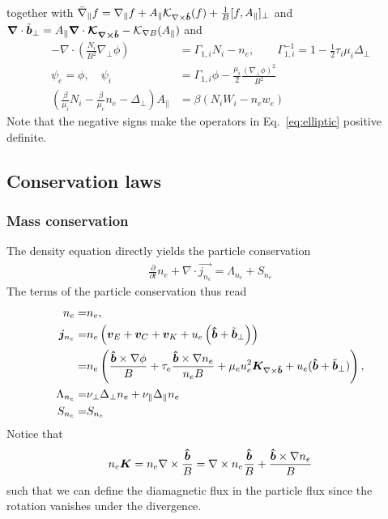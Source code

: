 together with
$\bar\nabla_\parallel f = \nabla_\parallel f + A_\parallel \mathcal K_{\nabla\times\bm{\hat{b}}}(f) + \frac{1}{B}[ f, A_\parallel]_\perp$
and ${\boldsymbol{\nabla}} \cdot \tilde{ {\boldsymbol{b}}}_\perp = A_\parallel {\boldsymbol{\nabla}}\cdot{\boldsymbol{ \mathcal{ K}_{\nabla\times\bm{\hat{b}}}}} - \mathcal K_{\nabla B}(A_\parallel) $
and
\begin{subequations} \label{eq:elliptic}
  \begin{align}
    -\nabla\cdot\left( \frac{N_i}{B^2}\nabla_\perp \phi \right) &= \Gamma_{1,i} N_i - n_e, \quad\quad
    \Gamma_{1,i}^{-1} = 1-\frac{1}{2}\tau_i\mu_i \Delta_\perp \\
    \psi_e = \phi, \quad \psi_i &= \Gamma_{1,i}\phi -\frac{\mu_i}{2}\frac{(\nabla_\perp\phi)^2}{B^2} \\
    \left(\frac{\beta}{\mu_i}N_i - \frac{\beta}{\mu_e}n_e-\Delta_\perp\right)
    A_\parallel &= \beta\left(N_iW_i-n_e w_e\right)
  \end{align}
\end{subequations}
Note that the negative signs make the operators in Eq.~\eqref{eq:elliptic} positive definite.
\subsection{Conservation laws} \label{sec:conservation}
\subsubsection{Mass conservation}
The density equation directly yields the particle conservation
\begin{align} \label{eq:mass_theorem}
  \frac{\partial}{\partial t} n_e
  + \nabla\cdot\vec{ j_{n_e}}
  =  \Lambda_{n_e}+S_{n_e}
\end{align}
The terms of the particle conservation thus read
\begin{align} \label{eq:mass_conservation}
  n_e= & n_e,\\
  {\boldsymbol{j}}_{n_e} =& n_e\left(
  {\boldsymbol{v}}_E + {\boldsymbol{v}}_C + {\boldsymbol{v}}_{K} +u_e\left(\bm{\hat{b}}+\tilde{{\boldsymbol{b}}}_\perp\right)  \right) \nonumber\\
  =& n_e \left(\frac{\bm{\hat{b}}\times \nabla\phi}{B} 
  + \tau_e \frac{\bm{\hat{b}}\times\nabla n_e}{n_eB} 
  + \mu_e u_e^2{\boldsymbol{K}}_{\nabla\times\bm{\hat{b}}} 
  + u_e(\bm{\hat{b}} + \tilde{{\boldsymbol{b}}}_\perp) \right), \\
  \Lambda_{n_e} =&
  \nu_\perp\Delta_\perp n_e + \nu_\parallel\Delta_\parallel n_e
\\
  S_{n_e} =&  S_{n_e}
\end{align}
Notice that
\begin{align}
n_e {\boldsymbol{K}} = n_e\nabla\times\frac{\bm{\hat{b}}}{B} = \nabla\times n_e\frac{\bm{\hat{b}}}{B} + \frac{\bm{\hat{b}}\times\nabla n_e}{B}
\label{}
\end{align}
such that we can define the diamagnetic flux in the particle flux since
the rotation vanishes under the divergence.

